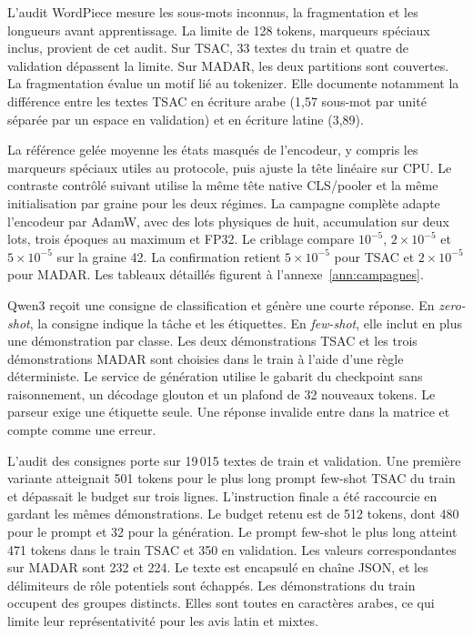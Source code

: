 L’audit WordPiece mesure les sous-mots inconnus, la fragmentation et les longueurs avant apprentissage. La limite de 128 tokens, marqueurs spéciaux inclus, provient de cet audit. Sur TSAC, 33 textes du train et quatre de validation dépassent la limite. Sur MADAR, les deux partitions sont couvertes. La fragmentation évalue un motif lié au tokenizer. Elle documente notamment la différence entre les textes TSAC en écriture arabe (1,57 sous-mot par unité séparée par un espace en validation) et en écriture latine (3,89).

La référence gelée moyenne les états masqués de l’encodeur, y compris les marqueurs spéciaux utiles au protocole, puis ajuste la tête linéaire sur CPU. Le contraste contrôlé suivant utilise la même tête native CLS/pooler et la même initialisation par graine pour les deux régimes. La campagne complète adapte l’encodeur par AdamW, avec des lots physiques de huit, accumulation sur deux lots, trois époques au maximum et FP32. Le criblage compare $10^{-5}$, $2\times10^{-5}$ et $5\times10^{-5}$ sur la graine 42. La confirmation retient $5\times10^{-5}$ pour TSAC et $2\times10^{-5}$ pour MADAR. Les tableaux détaillés figurent à l’annexe~\ref{ann:campagnes}.

Qwen3 reçoit une consigne de classification et génère une courte réponse. En \emph{zero-shot}, la consigne indique la tâche et les étiquettes. En \emph{few-shot}, elle inclut en plus une démonstration par classe. Les deux démonstrations TSAC et les trois démonstrations MADAR sont choisies dans le train à l’aide d’une règle déterministe. Le service de génération utilise le gabarit du checkpoint sans raisonnement, un décodage glouton et un plafond de 32 nouveaux tokens. Le parseur exige une étiquette seule. Une réponse invalide entre dans la matrice et compte comme une erreur.

L’audit des consignes porte sur 19\,015 textes de train et validation. Une première variante atteignait 501 tokens pour le plus long prompt few-shot TSAC du train et dépassait le budget sur trois lignes. L’instruction finale a été raccourcie en gardant les mêmes démonstrations. Le budget retenu est de 512 tokens, dont 480 pour le prompt et 32 pour la génération. Le prompt few-shot le plus long atteint 471 tokens dans le train TSAC et 350 en validation. Les valeurs correspondantes sur MADAR sont 232 et 224. Le texte est encapsulé en chaîne JSON, et les délimiteurs de rôle potentiels sont échappés. Les démonstrations du train occupent des groupes distincts. Elles sont toutes en caractères arabes, ce qui limite leur représentativité pour les avis latin et mixtes.


